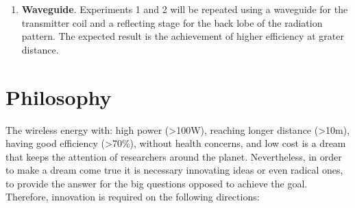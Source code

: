 \documentclass{intech}
\begin{document}
\begin{enumerate}
\item {\bf Waveguide}. Experiments 1 and 2 will be repeated using a waveguide for the transmitter coil and a reflecting stage for the back lobe of the radiation pattern. The expected result is the achievement of higher efficiency at grater distance.
\end{enumerate}
\section{Philosophy}
The wireless energy with: high power (>100W), reaching longer distance (>10m), having good efficiency (>70\%), without health concerns, and low cost is a dream that keeps the attention of researchers around the planet. Nevertheless, in order to make a dream come true it is necessary innovating ideas or even radical ones, to provide the answer for the big questions opposed to achieve the goal. Therefore, innovation is required on the following directions:
\end{document}
